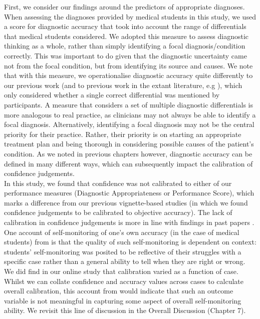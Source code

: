 \documentclass[a4paper, nobind]{templates/ociamthesis}
\begin{document}
First, we consider our findings around the predictors of appropriate diagnoses. When assessing the diagnoses provided by medical students in this study, we used a score for diagnostic accuracy that took into account the range of differentials that medical students considered. We adopted this measure to assess diagnostic thinking as a whole, rather than simply identifying a focal diagnosis/condition correctly. This was important to do given that the diagnostic uncertainty came not from the focal condition, but from identifying its source and causes. We note that with this measure, we operationalise diagnostic accuracy quite differently to our previous work (and to previous work in the extant literature, e.g \autocite{meyer_physicians_2013,kammer_differential_2021}), which only considered whether a single correct differential was mentioned by participants. A measure that considers a set of multiple diagnostic differentials is more analogous to real practice, as clinicians may not always be able to identify a focal diagnosis. Alternatively, identifying a focal diagnosis may not be the central priority for their practice. Rather, their priority is on starting an appropriate treatment plan and being thorough in considering possible causes of the patient's condition. As we noted in previous chapters however, diagnostic accuracy can be defined in many different ways, which can subsequently impact the calibration of confidence judgements.\\

In this study, we found that confidence was not calibrated to either of our performance measures (Diagnostic Appropriateness or Performance Score), which marks a difference from our previous vignette-based studies (in which we found confidence judgements to be calibrated to objective accuracy). The lack of calibration in confidence judgements is more in line with findings in past papers \autocite{friedman_are_2001,meyer_physicians_2013,jaspan_improving_2022}. One account of self-monitoring of one's own accuracy (in the case of medical students) from \textcite{hautz_accuracy_2019} is that the quality of such self-monitoring is dependent on context: students' self-monitoring was posited to be reflective of their struggles with a specific case rather than a general ability to tell when they are right or wrong. We did find in our online study that calibration varied as a function of case. Whilst we can collate confidence and accuracy values across cases to calculate overall calibration, this account from \textcite{hautz_accuracy_2019} would indicate that such an outcome variable is not meaningful in capturing some aspect of overall self-monitoring ability. We revisit this line of discussion in the Overall Discussion (Chapter 7).\\
\end{document}
